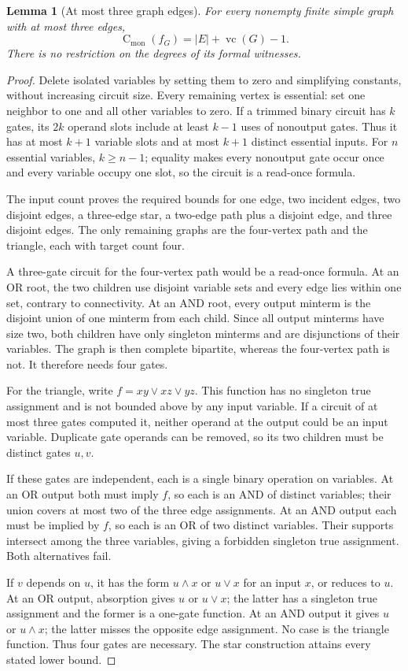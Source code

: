 \documentclass[11pt]{article}
\newcommand{\vc}{\operatorname{vc}}
\newcommand{\cmon}{\operatorname{C}_{\mathrm{mon}}}
\newtheorem{lemma}[theorem]{Lemma}
\theoremstyle{definition}
\theoremstyle{remark}
\begin{document}
\begin{lemma}[At most three graph edges]\label{lem:smalledge}
For every nonempty finite simple graph with at most three edges,
\[
 \cmon(f_G)=|E|+\vc(G)-1.
\]
There is no restriction on the degrees of its formal witnesses.
\end{lemma}
\begin{proof}
Delete isolated variables by setting them to zero and simplifying constants, without increasing circuit size. Every remaining vertex is essential: set one neighbor to one and all other variables to zero. If a trimmed binary circuit has $k$ gates, its $2k$ operand slots include at least $k-1$ uses of nonoutput gates. Thus it has at most $k+1$ variable slots and at most $k+1$ distinct essential inputs. For $n$ essential variables, $k\ge n-1$; equality makes every nonoutput gate occur once and every variable occupy one slot, so the circuit is a read-once formula.

The input count proves the required bounds for one edge, two incident edges, two disjoint edges, a three-edge star, a two-edge path plus a disjoint edge, and three disjoint edges. The only remaining graphs are the four-vertex path and the triangle, each with target count four.

A three-gate circuit for the four-vertex path would be a read-once formula. At an OR root, the two children use disjoint variable sets and every edge lies within one set, contrary to connectivity. At an AND root, every output minterm is the disjoint union of one minterm from each child. Since all output minterms have size two, both children have only singleton minterms and are disjunctions of their variables. The graph is then complete bipartite, whereas the four-vertex path is not. It therefore needs four gates.

For the triangle, write $f=xy\vee xz\vee yz$. This function has no singleton true assignment and is not bounded above by any input variable. If a circuit of at most three gates computed it, neither operand at the output could be an input variable. Duplicate gate operands can be removed, so its two children must be distinct gates $u,v$.

If these gates are independent, each is a single binary operation on variables. At an OR output both must imply $f$, so each is an AND of distinct variables; their union covers at most two of the three edge assignments. At an AND output each must be implied by $f$, so each is an OR of two distinct variables. Their supports intersect among the three variables, giving a forbidden singleton true assignment. Both alternatives fail.

If $v$ depends on $u$, it has the form $u\wedge x$ or $u\vee x$ for an input $x$, or reduces to $u$. At an OR output, absorption gives $u$ or $u\vee x$; the latter has a singleton true assignment and the former is a one-gate function. At an AND output it gives $u$ or $u\wedge x$; the latter misses the opposite edge assignment. No case is the triangle function. Thus four gates are necessary. The star construction attains every stated lower bound.
\end{proof}
\end{document}
